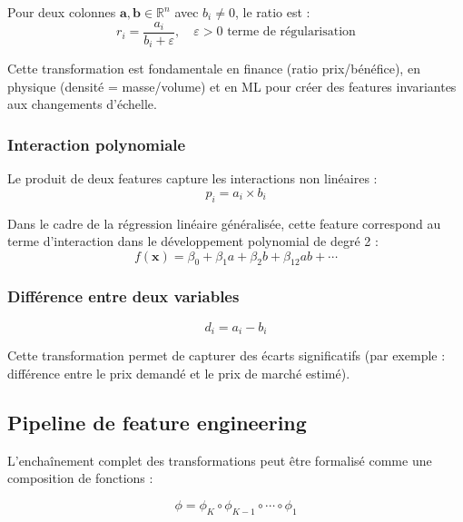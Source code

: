\documentclass[12pt,a4paper]{article}
\newcounter{defcount}[section]
\newenvironment{definition}[1]{%
  \stepcounter{defcount}%
  \begin{tcolorbox}[defstyle={Définition \thesection.\thedefcount\ — #1}]
}{%
  \end{tcolorbox}
}
\begin{document}
\begin{definition}{Feature de ratio}
Pour deux colonnes $\mathbf{a}, \mathbf{b} \in \mathbb{R}^n$ avec
$b_i \neq 0$, le ratio est :
\begin{equation}
  r_i = \frac{a_i}{b_i + \varepsilon}, \quad \varepsilon > 0 \text{ terme de régularisation}
\end{equation}
\end{definition}

Cette transformation est fondamentale en finance (ratio prix/bénéfice),
en physique (densité = masse/volume) et en ML pour créer des features
invariantes aux changements d'échelle.

\subsubsection{Interaction polynomiale}

Le produit de deux features capture les interactions non linéaires :
\begin{equation}
  p_i = a_i \times b_i
\end{equation}

Dans le cadre de la régression linéaire généralisée, cette feature correspond
au terme d'interaction dans le développement polynomial de degré 2 :
\begin{equation}
  f(\mathbf{x}) = \beta_0 + \beta_1 a + \beta_2 b + \beta_{12} ab + \cdots
\end{equation}

\subsubsection{Différence entre deux variables}

\begin{equation}
  d_i = a_i - b_i
\end{equation}

Cette transformation permet de capturer des écarts significatifs (par exemple :
différence entre le prix demandé et le prix de marché estimé).

\subsection{Pipeline de feature engineering}

L'enchaînement complet des transformations peut être formalisé comme une composition
de fonctions :

\begin{equation}
  \phi = \phi_K \circ \phi_{K-1} \circ \cdots \circ \phi_1
\end{equation}
\end{document}
